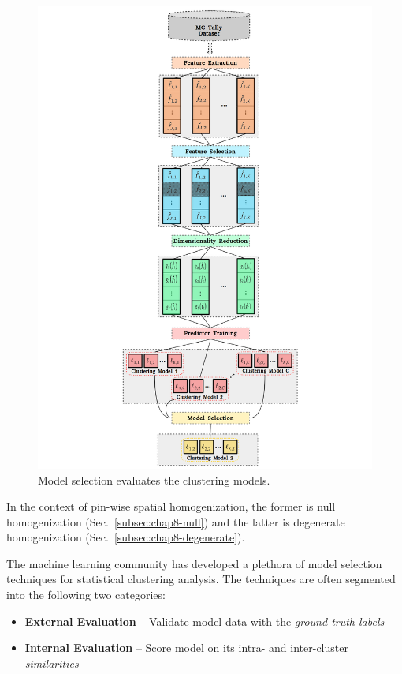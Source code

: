 \begin{figure}[h!]
\centering
\includegraphics[width=0.95\linewidth]{figures/unsupervised/features/engineering/model}
\vspace{2mm}
\caption[\textit{i}MGXS model selection]{Model selection evaluates the clustering models.}
\label{fig:chap10-model}
\end{figure}

\noindent In the context of pin-wise spatial homogenization, the former is null homogenization (Sec.~\ref{subsec:chap8-null}) and the latter is degenerate homogenization (Sec.~\ref{subsec:chap8-degenerate}).

The machine learning community has developed a plethora of model selection techniques for statistical clustering analysis. The techniques are often segmented into the following two categories:

\begin{itemize}[noitemsep]
\item \textbf{External Evaluation} -- Validate model data with the \textit{ground truth labels}
\item \textbf{Internal Evaluation} -- Score model on its intra- and inter-cluster \textit{similarities}
\end{itemize}

